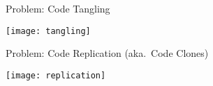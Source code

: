\begin{frame}{Problem: Code Tangling }
	\begin{center}
		\vspace{-2mm}
		\texttt{[image: tangling]}
	\end{center}
\end{frame}

\begin{frame}{Problem: Code Replication (aka.\ Code Clones)}
	\begin{center}
		\vspace{-2mm}
		\texttt{[image: replication]}
	\end{center}
\end{frame}
